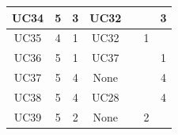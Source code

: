 \documentclass[12pt]{article}
\begin{document}
\begin{longtable}{|c|ccc|l|l|l|}
		UC34                 & \multicolumn{1}{c|}{5}               & \multicolumn{1}{c|}{3}                                                                         & UC32               &                                                                                            &                                                                                               & \multicolumn{1}{c|}{3}                                                                     \\ \hline
		UC35                 & \multicolumn{1}{c|}{4}               & \multicolumn{1}{c|}{1}                                                                         & UC32               &                                                                                            & \multicolumn{1}{c|}{1}                                                                        &                                                                                            \\ \hline
		UC36                 & \multicolumn{1}{c|}{5}               & \multicolumn{1}{c|}{1}                                                                         & UC37               &                                                                                            &                                                                                               & \multicolumn{1}{c|}{1}                                                                     \\ \hline
		UC37                 & \multicolumn{1}{c|}{5}               & \multicolumn{1}{c|}{4}                                                                         & None               &                                                                                            &                                                                                               & \multicolumn{1}{c|}{4}                                                                     \\ \hline
		UC38                 & \multicolumn{1}{c|}{5}               & \multicolumn{1}{c|}{4}                                                                         & UC28               &                                                                                            &                                                                                               & \multicolumn{1}{c|}{4}                                                                     \\ \hline
		UC39                 & \multicolumn{1}{c|}{5}               & \multicolumn{1}{c|}{2}                                                                         & None               &                                                                                            & \multicolumn{1}{c|}{2}                                                                        &                                                                                            \\ \hline

\end{longtable}
\end{document}

